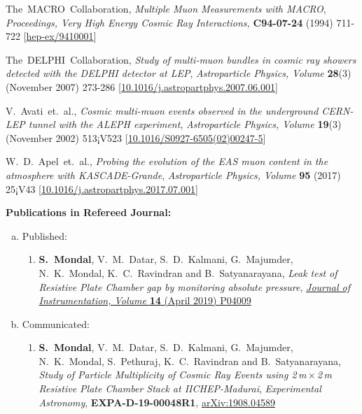 \documentclass[a4paper,12pt,twoside,openany]{article}
\begin{document}
\begin{thebibliography}{9}
  The~MACRO~Collaboration, \emph{Multiple Muon Measurements with MACRO}, \emph{Proceedings, Very High Energy Cosmic Ray Interactions,} \textbf{C94-07-24} (1994) 711-722 [\href{https://arxiv.org/abs/hep-ex/9410001}{hep-ex/9410001}]

  The~DELPHI~Collaboration, \emph{Study of multi-muon bundles in cosmic ray showers detected with the DELPHI detector at LEP}, \emph{Astroparticle Physics, Volume }\textbf{28}(3) (November 2007) 273-286 [\href{https://doi.org/10.1016/j.astropartphys.2007.06.001}{10.1016/j.astropartphys.2007.06.001}]

  V.~Avati~et.~al., \emph{Cosmic multi-muon events observed in the underground CERN-LEP tunnel with the ALEPH experiment}, \emph{Astroparticle Physics, Volume }\textbf{19}(3) (November 2002) 513¡V523 [\href{https://doi.org/10.1016/S0927-6505(02)00247-5}{10.1016/S0927-6505(02)00247-5}]

  W.~D.~Apel~et.~al., \emph{Probing the evolution of the EAS muon content in the atmosphere with KASCADE-Grande}, \emph{Astroparticle Physics, Volume }\textbf{95} (2017) 25¡V43 [\href{https://doi.org/10.1016/j.astropartphys.2017.07.001}{10.1016/j.astropartphys.2017.07.001}]

\end{thebibliography}





\clearpage{\thispagestyle{empty}\cleardoublepage}

\noindent\textbf{Publications in Refereed Journal:}
\begin{enumerate}[a.]
\item Published:
  \begin{enumerate}[1)]
  \item \textbf{S.~Mondal}, V.~M.~Datar, S.~D.~Kalmani, G.~Majumder, N.~K.~Mondal, K.~C.~Ravindran and B.~Satyanarayana, \emph{Leak test of Resistive Plate Chamber gap by monitoring absolute pressure}, \href{https://doi.org/10.1088/1748-0221/14/04/P04009}{\emph{Journal of Instrumentation, Volume } \textbf{14} (April 2019) P04009}
  \end{enumerate}
\item Communicated:
  \begin{enumerate}[1)]
  \item \textbf{S.~Mondal}, V.~M.~Datar, S.~D.~Kalmani, G.~Majumder, N.~K.~Mondal, S.~Pethuraj, K.~C.~Ravindran and B.~Satyanarayana, \emph{Study of Particle Multiplicity of Cosmic Ray Events using 2\,m\,$\times$\,2\,m Resistive Plate Chamber Stack at IICHEP-Madurai}, \emph{Experimental Astronomy}, \textbf{EXPA-D-19-00048R1}, \href{https://arxiv.org/abs/1908.04589}{arXiv:1908.04589}
  \end{enumerate}
\end{enumerate}
\end{document}
